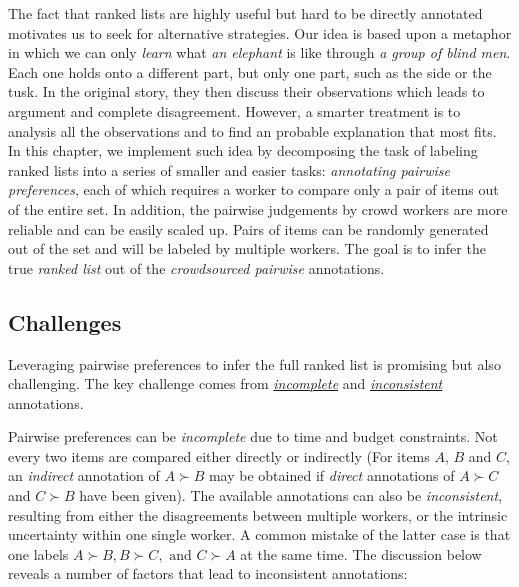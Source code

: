 The fact that ranked lists are highly useful but hard to be directly annotated
motivates us to seek for alternative strategies.  Our idea is based upon a
metaphor in which we can only \emph{learn} what \emph{an elephant} is like
through \emph{a group of blind men}. Each one holds onto a different part, but
only one part, such as the side or the tusk. In the original story, they then
discuss their observations which leads to argument and complete disagreement.
However, a smarter treatment is to analysis all the observations and to find an
probable explanation that most fits. In this chapter, we implement such idea by
decomposing the task of labeling ranked lists into a series of smaller and
easier tasks: \textit{annotating pairwise preferences}, each of which requires a
worker to compare only a pair of items out of the entire set.  In addition, the
pairwise judgements by crowd workers are more reliable and can be easily scaled
up. Pairs of items can be randomly generated out of the set and will be labeled
by multiple workers.  The goal is to infer the true \emph{ranked list} out of
the \emph{crowdsourced pairwise} annotations.

\subsection{Challenges}

Leveraging pairwise preferences to infer the full ranked list is promising but
also challenging. The key challenge comes from \emph{\underline{incomplete}} and
\emph{\underline{inconsistent}} annotations.

Pairwise preferences can be \emph{incomplete} due to time and budget
constraints. Not every two items are compared either directly or indirectly (For
items $A$, $B$ and $C$, an \textit{indirect} annotation of $A \succ B$ may be
obtained if \textit{direct} annotations of $A \succ C$ and $C \succ B$ have been
given). The available annotations can also be \emph{inconsistent}, resulting
from either the disagreements between multiple workers, or the intrinsic
uncertainty within one single worker. A common mistake of the latter case is
that one labels  $A \succ B, B \succ C, \mbox{ and } C \succ A$ at the same
time. The discussion below reveals a number of factors that lead to inconsistent
annotations:

